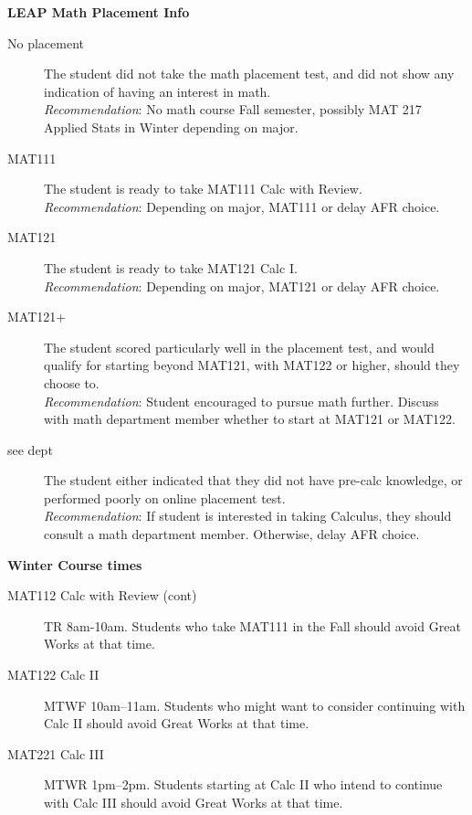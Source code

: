 \documentclass{article}
\begin{document}
{\Large \begin{center}\textbf{LEAP Math Placement Info}\end{center}}
\begin{description}
\item[No placement] The student did not take the math placement test, and did not show any indication of having an interest in math.\\ \emph{Recommendation}: No math course Fall semester, possibly MAT 217 Applied Stats in Winter depending on major.
\item[MAT111] The student is ready to take MAT111 Calc with Review.\\ \emph{Recommendation}: Depending on major, MAT111 or delay AFR choice.
\item[MAT121] The student is ready to take MAT121 Calc I.\\ \emph{Recommendation}: Depending on major, MAT121 or delay AFR choice.
\item[MAT121+] The student scored particularly well in the placement test, and would qualify for starting beyond MAT121, with MAT122 or higher, should they choose to.\\ \emph{Recommendation}: Student encouraged to pursue math further. Discuss with math department member whether to start at MAT121 or MAT122.
\item[see dept] The student either indicated that they did not have pre-calc knowledge, or performed poorly on online placement test.\\ \emph{Recommendation}: If student is interested in taking Calculus, they should consult a math department member. Otherwise, delay AFR choice.
\end{description}
\vfill
{\large\textbf{Winter Course times}}
\begin{description}
\item[MAT112 Calc with Review (cont)] TR 8am-10am. Students who take MAT111 in the Fall should avoid Great Works at that time.
\item[MAT122 Calc II] MTWF 10am--11am. Students who might want to consider continuing with Calc II should avoid Great Works at that time.
\item[MAT221 Calc III] MTWR 1pm--2pm. Students starting at Calc II who intend to continue with Calc III should avoid Great Works at that time.
\end{description}
\vfill
\end{document}
